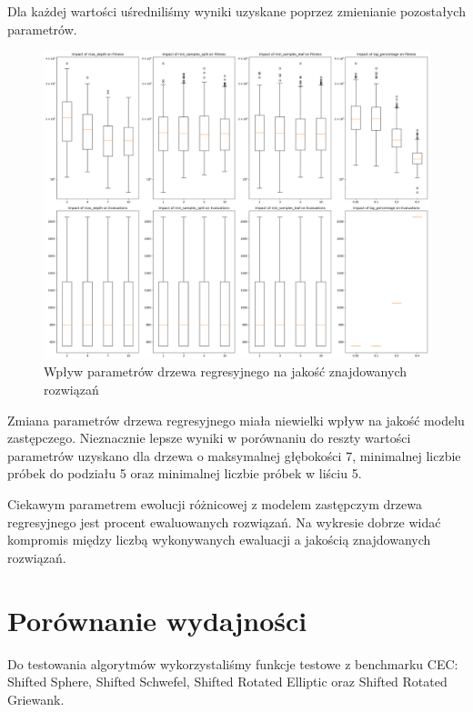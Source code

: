 \documentclass{article}
\begin{document}
Dla każdej wartości uśredniliśmy wyniki uzyskane poprzez zmienianie pozostałych parametrów.

\begin{figure}[H]
    \centering
    \includegraphics[width=\textwidth]{tree_parameter_results.png}
    \caption{Wpływ parametrów drzewa regresyjnego na jakość znajdowanych rozwiązań}
    \label{fig:tree_results}
\end{figure}

Zmiana parametrów drzewa regresyjnego miała niewielki wpływ na jakość modelu zastępczego. Nieznacznie lepsze wyniki w porównaniu do reszty wartości parametrów uzyskano dla drzewa o maksymalnej głębokości 7, minimalnej liczbie próbek do podziału 5 oraz minimalnej liczbie próbek w liściu 5.

Ciekawym parametrem ewolucji różnicowej z modelem zastępczym drzewa regresyjnego jest procent ewaluowanych rozwiązań. Na wykresie dobrze widać kompromis między liczbą wykonywanych ewaluacji a jakością znajdowanych rozwiązań. 

\section{Porównanie wydajności}

Do testowania algorytmów wykorzystaliśmy funkcje testowe z benchmarku CEC: Shifted Sphere, Shifted Schwefel, Shifted Rotated Elliptic oraz Shifted Rotated Griewank.
\end{document}

